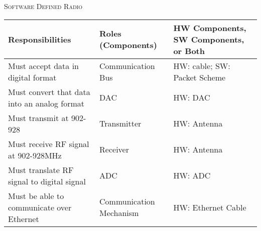 \documentclass[RRC.tex]{subfiles}
\begin{document}
\bigskip

\begin{center}
	\textsc{\Large Software Defined Radio}
	\hrulefill
	\begin{tabular}{ | p{5cm} | p{5cm} | p{5cm} |}
		\hline
		Responsibilities & Roles (Components) & HW Components, SW Components, or Both \\ \hline
		Must accept data in digital format & Communication Bus & HW: cable; SW: Packet Scheme \\ \hline
		Must convert that data into an analog format & DAC & HW: DAC  \\ \hline
		Must transmit at 902-928 & Transmitter & HW: Antenna \\ \hline
		Must receive RF signal at 902-928MHz & Receiver & HW: Antenna \\ \hline
		Must translate RF signal to digital signal & ADC & HW: ADC \\ \hline
		Must be able to communicate over Ethernet & Communication Mechanism & HW: Ethernet Cable \\ \hline
	\end{tabular}
\end{center}
\end{document}
